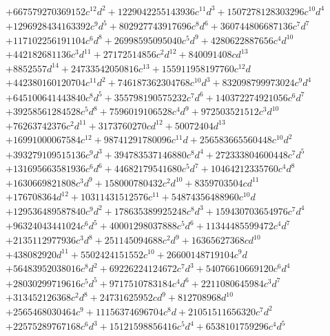 {\begin{align*}
&+667579270369152c^{12}d^{2}+1229042255143936c^{11}d^{3}+1507278128303296c^{10}d^{4}\\
&+1296928434163392c^{9}d^{5}+802927743917696c^{8}d^{6}+360744806687136c^{7}d^{7}\\
&+117102256191104c^{6}d^{8}+26998595095040c^{5}d^{9}+4280622887656c^{4}d^{10}\\
&+442182681136c^{3}d^{11}+27172514856c^{2}d^{12}+840091408cd^{13}\\
&+8852557d^{14}+24733542050816c^{13}+155911958197760c^{12}d\\
&+442380160120704c^{11}d^{2}+746187362304768c^{10}d^{3}+832098799973024c^{9}d^{4}\\
&+645100641443840c^{8}d^{5}+355798190575232c^{7}d^{6}+140372274921056c^{6}d^{7}\\
&+39258561284528c^{5}d^{8}+7596019106528c^{4}d^{9}+972503521512c^{3}d^{10}\\
&+76263742376c^{2}d^{11}+3173760270cd^{12}+50072404d^{13}\\
&+16991000067584c^{12}+98741291780096c^{11}d+256583665560448c^{10}d^{2}\\
&+393279109515136c^{9}d^{3}+394783537146880c^{8}d^{4}+272333804600448c^{7}d^{5}\\
&+131695663581936c^{6}d^{6}+44682179541680c^{5}d^{7}+10464212335760c^{4}d^{8}\\
&+1630669821808c^{3}d^{9}+158000780432c^{2}d^{10}+8359703504cd^{11}\\
&+176708364d^{12}+10311431512576c^{11}+54874356488960c^{10}d\\
&+129536489587840c^{9}d^{2}+178635389925248c^{8}d^{3}+159430703654976c^{7}d^{4}\\
&+96324043441024c^{6}d^{5}+40001298037888c^{5}d^{6}+11344485599472c^{4}d^{7}\\
&+2135112977936c^{3}d^{8}+251145094688c^{2}d^{9}+16365627368cd^{10}\\
&+438082920d^{11}+5502424151552c^{10}+26600148719104c^{9}d\\
&+56483952038016c^{8}d^{2}+69226224124672c^{7}d^{3}+54076610669120c^{6}d^{4}\\
&+28030299719616c^{5}d^{5}+9717510783184c^{4}d^{6}+2211080645984c^{3}d^{7}\\
&+313452126368c^{2}d^{8}+24731625952cd^{9}+812708968d^{10}\\
&+2565468030464c^{9}+11156374696704c^{8}d+21051511656320c^{7}d^{2}\\
&+22575289767168c^{6}d^{3}+15121598856416c^{5}d^{4}+6538101759296c^{4}d^{5}\\

\end{align*}}
